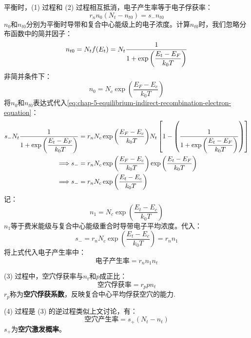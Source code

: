 平衡时，(1) 过程和 (2) 过程相互抵消，电子产生率等于电子俘获率：
\begin{equation}
    r_nn_0(N_t-n_{t0})=s_-n_{t0}\label{eq:chap-5-equilibrium-indirect-recombination-electron-equation}
\end{equation}
$n_0$和$n_{t0}$分别为平衡时导带和复合中心能级上的电子浓度。计算$n_{t0}$时，我们忽略分布函数中的简并因子：
\begin{equation}
    n_{t0}=N_tf(E_t)=N_t\frac{1}{\displaystyle 1+\exp{\left(\frac{E_t-E_F}{k_0T}\right)}}
\end{equation}
非简并条件下：
\begin{equation}
    n_0=N_c\exp{\left(\frac{E_F-E_c}{k_0T}\right)}
\end{equation}
将$n_0$和$n_{t0}$表达式代入\autoref{eq:chap-5-equilibrium-indirect-recombination-electron-equation}：
\begin{align}
    s_-N_t\frac{1}{\displaystyle 1+\exp{\left(\frac{E_t-E_F}{k_0T}\right)}}&=r_nN_c\exp{\left(\frac{E_F-E_c}{k_0T}\right)}N_t\left[1-\left(\frac{1}{\displaystyle 1+\exp{\left(\frac{E_t-E_F}{k_0T}\right)}}\right)\right]\notag\\
    \Longrightarrow s_-&=r_nN_c\exp{\left(\frac{E_F-E_c}{k_0T}\right)}\exp{\left(\frac{E_t-E_F}{k_0T}\right)}\notag\\
    \Longrightarrow s_-&=r_nN_c\exp{\left(\frac{E_t-E_c}{k_0T}\right)}
\end{align}
记：
\begin{equation}
    n_1=N_c\exp{\left(\frac{E_t-E_c}{k_0T}\right)}
\end{equation}
$n_1$等于费米能级与复合中心能级重合时导带电子平均浓度。代入：
\begin{equation}
    s_-=r_nN_c\exp{\left(\frac{E_t-E_c}{k_0T}\right)}=r_nn_1
\end{equation}
将上式代入电子产生率中：
\begin{equation}
    \text{电子产生率}=r_nn_1n_t
\end{equation}

(3) 过程中，空穴俘获率与$n_t$和$p$成正比：
\begin{equation}
    \text{空穴俘获率}=r_ppn_t
\end{equation}
$r_p$称为\textbf{空穴俘获系数}，反映复合中心平均俘获空穴的能力.

(4) 过程是 (3) 的逆过程类似上文讨论，有：
\begin{equation}
    \text{空穴产生率}=s_+(N_t-n_t)
\end{equation}
$s_+$为\textbf{空穴激发概率}。

